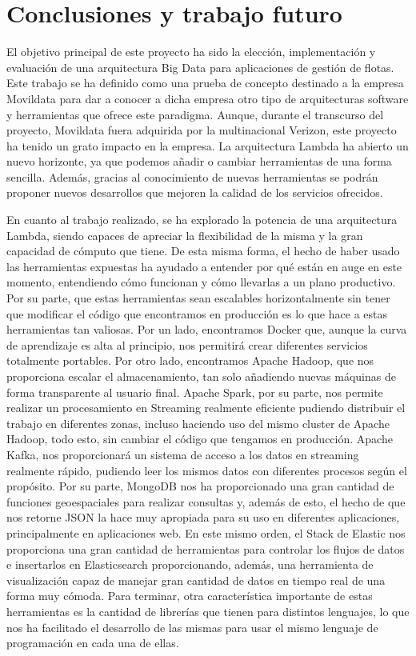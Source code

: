\section{Conclusiones y trabajo futuro}

El objetivo principal de este proyecto ha sido la elección, implementación y evaluación de una arquitectura Big Data para aplicaciones de gestión de flotas. Este trabajo se ha definido como una prueba de concepto destinado a la empresa Movildata para dar a conocer a dicha empresa otro tipo de arquitecturas software y herramientas que ofrece este paradigma. Aunque, durante el transcurso del proyecto, Movildata fuera adquirida por la multinacional Verizon, este proyecto ha tenido un grato impacto en la empresa. La arquitectura Lambda ha abierto un nuevo horizonte, ya que podemos añadir o cambiar herramientas de una forma sencilla. Además, gracias al conocimiento de nuevas herramientas se podrán proponer nuevos desarrollos que mejoren la calidad de los servicios ofrecidos.

En cuanto al trabajo realizado, se ha explorado la potencia de una arquitectura Lambda, siendo capaces de apreciar la flexibilidad de la misma y la gran capacidad de cómputo que tiene. De esta misma forma, el hecho de haber usado las herramientas expuestas ha ayudado a entender por qué están en auge en este momento, entendiendo cómo funcionan y cómo llevarlas a un plano productivo. Por su parte, que estas herramientas sean escalables horizontalmente sin tener que modificar el código que encontramos en producción es lo que hace a estas herramientas tan valiosas. Por un lado, encontramos Docker que, aunque la curva de aprendizaje es alta al principio, nos permitirá crear diferentes servicios totalmente portables. Por otro lado, encontramos Apache Hadoop, que nos proporciona escalar el almacenamiento, tan solo añadiendo nuevas máquinas de forma transparente al usuario final. Apache Spark, por su parte, nos permite realizar un procesamiento en Streaming realmente eficiente pudiendo distribuir el trabajo en diferentes zonas, incluso haciendo uso del mismo cluster de Apache Hadoop, todo esto, sin cambiar el código que tengamos en producción. Apache Kafka, nos proporcionará un sistema de acceso a los datos en streaming realmente rápido, pudiendo leer los mismos datos con diferentes procesos según el propósito. Por su parte, MongoDB nos ha proporcionado una gran cantidad de funciones geoespaciales para realizar consultas y, además de esto, el hecho de que nos retorne JSON la hace muy apropiada para su uso en diferentes aplicaciones, principalmente en aplicaciones web. En este mismo orden, el Stack de Elastic nos proporciona una gran cantidad de herramientas para controlar los flujos de datos e insertarlos en Elasticsearch proporcionando, además, una herramienta de visualización capaz de manejar gran cantidad de datos en tiempo real de una forma muy cómoda. Para terminar, otra característica importante de estas herramientas es la cantidad de librerías que tienen para distintos lenguajes, lo que nos ha facilitado el desarrollo de las mismas para usar el mismo lenguaje de programación en cada una de ellas. 


